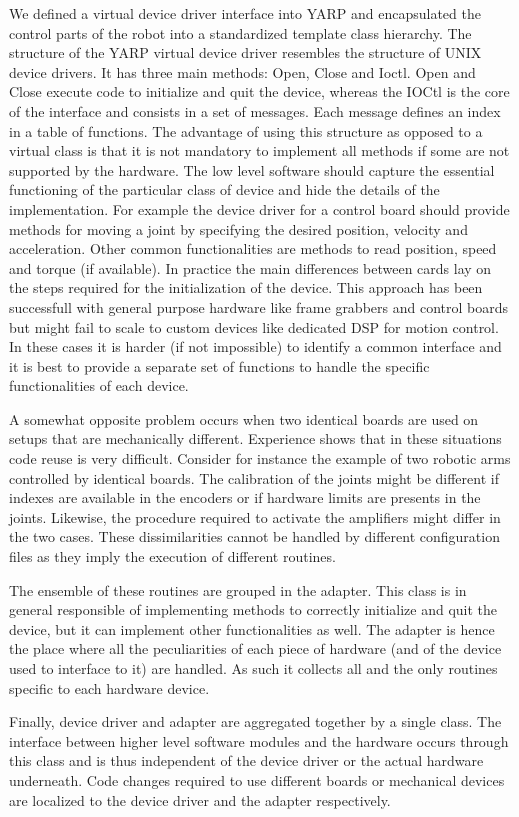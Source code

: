 We defined a virtual device driver interface into YARP and encapsulated the control parts of the robot into a standardized template class hierarchy. The structure of the YARP virtual device driver resembles the structure of UNIX device drivers. It has three main methods: Open, Close and Ioctl. Open and Close execute code to initialize and quit the device, whereas the IOCtl is the core of the interface and consists in a set of messages. Each message defines an index in a table of functions. The advantage of using this structure as opposed to a virtual class is that it is not mandatory to implement all methods if some are not supported by the hardware. 
The low level software should capture the essential functioning of the particular class of device and hide the details of the implementation. For example the device driver for a control board should provide methods for moving a joint by specifying the desired position, velocity and acceleration. Other common functionalities are methods to read position, speed and torque (if available). In practice the main differences between cards lay on the steps required for the initialization of the device. This approach has been successfull with general purpose hardware like frame grabbers and control boards but might fail to scale to custom devices like dedicated DSP for motion control. In these cases it is harder (if not impossible) to identify a common interface and it is best to provide a separate set of functions to handle the specific functionalities of each device. 

A somewhat opposite problem occurs when two identical boards are used on setups that are mechanically different. Experience shows that in these situations code reuse is very difficult. Consider for instance the example of two robotic arms controlled by identical boards. The calibration of the joints might be different if indexes are available in the encoders or if hardware limits are presents in the joints. Likewise, the procedure required to activate the amplifiers might differ in the two cases. These dissimilarities cannot be handled by different configuration files as they imply the execution of different routines.

The ensemble of these routines are grouped in the adapter. This class is in general responsible of implementing methods to correctly initialize and quit the device, but it can implement other functionalities as well. The adapter is hence the place where all the peculiarities of each piece of hardware (and of the device used to interface to it) are handled. As such it collects all and the only routines specific to each hardware device. 

Finally, device driver and adapter are aggregated together by a single class. The interface between higher level software modules and the hardware occurs through this class and is thus independent of the device driver or the actual hardware underneath. Code changes required to use different boards or mechanical devices are localized to the device driver and the adapter respectively.
